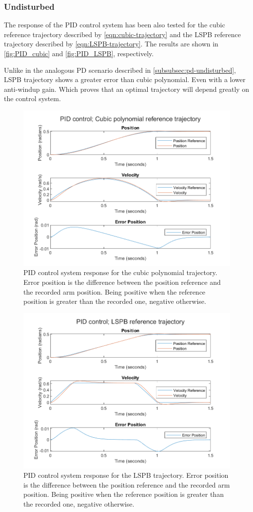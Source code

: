 \subsubsection{Undisturbed}
The response of the PID control system has been also tested for the cubic
reference trajectory described by \autoref{eqn:cubic-trajectory} and the LSPB
reference trajectory described by \autoref{eqn:LSPB-trajectory}. The results
are shown in \autoref{fig:PID_cubic} and \autoref{fig:PID_LSPB}, respectively.

Unlike in the analogous PD scenario described in
\autoref{subsubsec:pd-undisturbed}, LSPB trajectory shows a greater error than
cubic polynomial. Even with a lower anti-windup gain. Which proves that an
optimal trajectory will depend greatly on the control system.

\begin{figure}
    \centering
    \includegraphics[width=.7\textwidth]{PID_cubic.png}
    \caption{PID control system response for the cubic polynomial trajectory. Error position is the difference between the position reference and the recorded arm position. Being positive when the reference position is greater than the recorded one, negative otherwise.}
    \label{fig:PID_cubic}
\end{figure}

\begin{figure}
    \centering
    \includegraphics[width=.7\textwidth]{PID_LSPB.png}
    \caption{PID control system response for the LSPB trajectory. Error position is the difference between the position reference and the recorded arm position. Being positive when the reference position is greater than the recorded one, negative otherwise.}
    \label{fig:PID_LSPB}
\end{figure}

